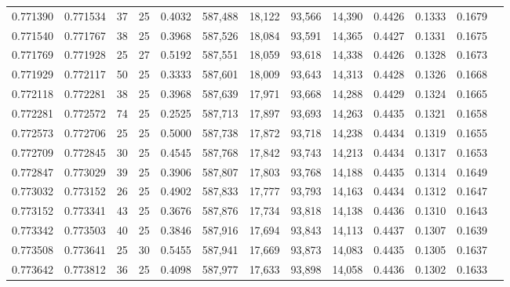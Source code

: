 \begin{tabular}{rrrrrrrrrrrrr}
0.771390 & 0.771534 &    37 &  25 &                                     0.4032 & 587,488 &  18,122 &  93,566 &  14,390 & 0.4426 & 0.1333 & 0.1679 \\
0.771540 & 0.771767 &    38 &  25 &                                     0.3968 & 587,526 &  18,084 &  93,591 &  14,365 & 0.4427 & 0.1331 & 0.1675 \\
0.771769 & 0.771928 &    25 &  27 &                                     0.5192 & 587,551 &  18,059 &  93,618 &  14,338 & 0.4426 & 0.1328 & 0.1673 \\
0.771929 & 0.772117 &    50 &  25 &                                     0.3333 & 587,601 &  18,009 &  93,643 &  14,313 & 0.4428 & 0.1326 & 0.1668 \\
0.772118 & 0.772281 &    38 &  25 &                                     0.3968 & 587,639 &  17,971 &  93,668 &  14,288 & 0.4429 & 0.1324 & 0.1665 \\
0.772281 & 0.772572 &    74 &  25 &                                     0.2525 & 587,713 &  17,897 &  93,693 &  14,263 & 0.4435 & 0.1321 & 0.1658 \\
0.772573 & 0.772706 &    25 &  25 &                                     0.5000 & 587,738 &  17,872 &  93,718 &  14,238 & 0.4434 & 0.1319 & 0.1655 \\
0.772709 & 0.772845 &    30 &  25 &                                     0.4545 & 587,768 &  17,842 &  93,743 &  14,213 & 0.4434 & 0.1317 & 0.1653 \\
0.772847 & 0.773029 &    39 &  25 &                                     0.3906 & 587,807 &  17,803 &  93,768 &  14,188 & 0.4435 & 0.1314 & 0.1649 \\
0.773032 & 0.773152 &    26 &  25 &                                     0.4902 & 587,833 &  17,777 &  93,793 &  14,163 & 0.4434 & 0.1312 & 0.1647 \\
0.773152 & 0.773341 &    43 &  25 &                                     0.3676 & 587,876 &  17,734 &  93,818 &  14,138 & 0.4436 & 0.1310 & 0.1643 \\
0.773342 & 0.773503 &    40 &  25 &                                     0.3846 & 587,916 &  17,694 &  93,843 &  14,113 & 0.4437 & 0.1307 & 0.1639 \\
0.773508 & 0.773641 &    25 &  30 &                                     0.5455 & 587,941 &  17,669 &  93,873 &  14,083 & 0.4435 & 0.1305 & 0.1637 \\
0.773642 & 0.773812 &    36 &  25 &                                     0.4098 & 587,977 &  17,633 &  93,898 &  14,058 & 0.4436 & 0.1302 & 0.1633 \\

\end{tabular}
